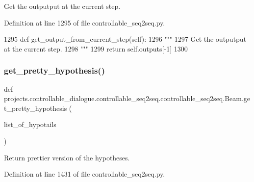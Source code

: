 \begin{DoxyVerb}Get the outputput at the current step.
\end{DoxyVerb}
 

Definition at line 1295 of file controllable\+\_\+seq2seq.\+py.


\begin{DoxyCode}
1295     \textcolor{keyword}{def }get\_output\_from\_current\_step(self):
1296         \textcolor{stringliteral}{"""}
1297 \textcolor{stringliteral}{        Get the outputput at the current step.}
1298 \textcolor{stringliteral}{        """}
1299         \textcolor{keywordflow}{return} self.outputs[-1]
1300 
\end{DoxyCode}
\mbox{\label{classprojects_1_1controllable__dialogue_1_1controllable__seq2seq_1_1controllable__seq2seq_1_1Beam_a8790caa6448f76b870a89dab9a07e419}} 
\subsubsection{\texorpdfstring{get\+\_\+pretty\+\_\+hypothesis()}{get\_pretty\_hypothesis()}}
{\footnotesize\ttfamily def projects.\+controllable\+\_\+dialogue.\+controllable\+\_\+seq2seq.\+controllable\+\_\+seq2seq.\+Beam.\+get\+\_\+pretty\+\_\+hypothesis (\begin{DoxyParamCaption}\item[{}]{list\+\_\+of\+\_\+hypotails }\end{DoxyParamCaption})\hspace{0.3cm}{\ttfamily [static]}}

\begin{DoxyVerb}Return prettier version of the hypotheses.
\end{DoxyVerb}
 

Definition at line 1431 of file controllable\+\_\+seq2seq.\+py.


